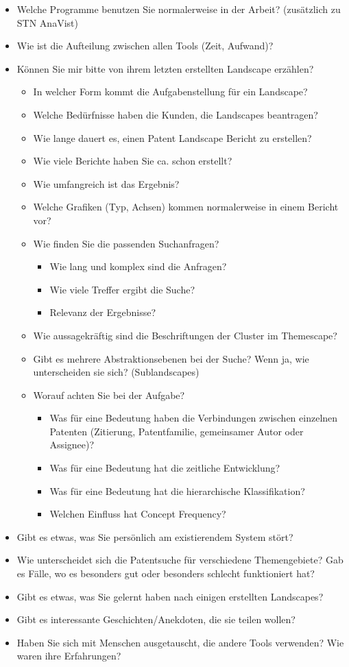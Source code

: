\begin{itemize}
\item Welche Programme benutzen Sie normalerweise in der Arbeit? (zusätzlich zu STN AnaVist)
\item Wie ist die Aufteilung zwischen allen Tools (Zeit, Aufwand)?
\item Können Sie mir bitte von ihrem letzten erstellten Landscape erzählen?
\begin{itemize}
\item In welcher Form kommt die Aufgabenstellung für ein Landscape?
\item Welche Bedürfnisse haben die Kunden, die Landscapes beantragen?
\item Wie lange dauert es, einen Patent Landscape Bericht zu erstellen?
\item Wie viele Berichte haben Sie ca. schon erstellt?
\item Wie umfangreich ist das Ergebnis?
\item Welche Grafiken (Typ, Achsen) kommen normalerweise in einem Bericht vor?
\item Wie finden Sie die passenden Suchanfragen?
\begin{itemize}
\item Wie lang und komplex sind die Anfragen?
\item Wie viele Treffer ergibt die Suche?
\item Relevanz der Ergebnisse?
\end{itemize}
\item Wie aussagekräftig sind die Beschriftungen der Cluster im Themescape?
\item Gibt es mehrere Abstraktionsebenen bei der Suche? Wenn ja, wie unterscheiden sie sich? (Sublandscapes)
\item Worauf achten Sie bei der Aufgabe?
\begin{itemize}
\item Was für eine Bedeutung haben die Verbindungen zwischen einzelnen Patenten (Zitierung, Patentfamilie, gemeinsamer Autor oder Assignee)?
\item Was für eine Bedeutung hat die zeitliche Entwicklung?
\item Was für eine Bedeutung hat die hierarchische Klassifikation?
\item Welchen Einfluss hat Concept Frequency?
\end{itemize}
\end{itemize}
\item Gibt es etwas, was Sie persönlich am existierendem System stört?
\item Wie unterscheidet sich die Patentsuche für verschiedene Themengebiete? Gab es Fälle, wo es besonders gut oder besonders schlecht funktioniert hat?
\item Gibt es etwas, was Sie gelernt haben nach einigen erstellten Landscapes?
\item Gibt es interessante Geschichten/Anekdoten, die sie teilen wollen?
\item Haben Sie sich mit Menschen ausgetauscht, die andere Tools verwenden? Wie waren ihre Erfahrungen?
\end{itemize}

